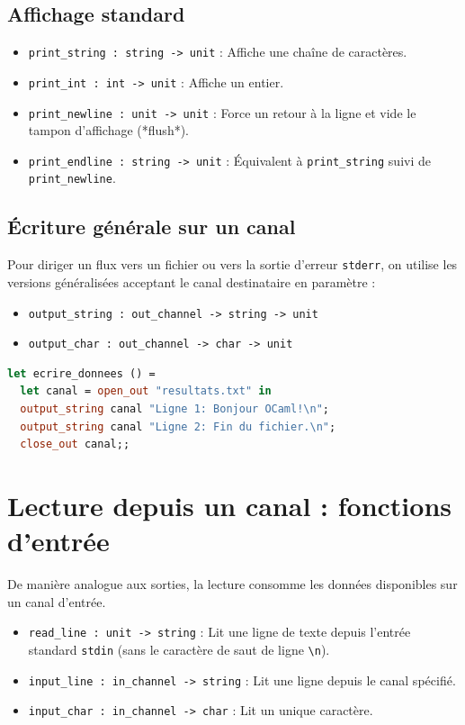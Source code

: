 \documentclass{article}
\begin{document}
\subsection{Affichage standard}
\begin{itemize}
    \item \texttt{print\_string : string -> unit} : Affiche une chaîne de caractères.
    \item \texttt{print\_int : int -> unit} : Affiche un entier.
    \item \texttt{print\_newline : unit -> unit} : Force un retour à la ligne et vide le tampon d'affichage (*flush*).
    \item \texttt{print\_endline : string -> unit} : Équivalent à \texttt{print\_string} suivi de \texttt{print\_newline}.
\end{itemize}

\subsection{Écriture générale sur un canal}
Pour diriger un flux vers un fichier ou vers la sortie d'erreur \texttt{stderr}, on utilise les versions généralisées acceptant le canal destinataire en paramètre :
\begin{itemize}
    \item \texttt{output\_string : out\_channel -> string -> unit}
    \item \texttt{output\_char : out\_channel -> char -> unit}
\end{itemize}

\begin{lstlisting}[language=Caml]
let ecrire_donnees () =
  let canal = open_out "resultats.txt" in
  output_string canal "Ligne 1: Bonjour OCaml!\n";
  output_string canal "Ligne 2: Fin du fichier.\n";
  close_out canal;;
\end{lstlisting}

\section{Lecture depuis un canal : fonctions d'entrée}

De manière analogue aux sorties, la lecture consomme les données disponibles sur un canal d'entrée.

\begin{itemize}
    \item \texttt{read\_line : unit -> string} : Lit une ligne de texte depuis l'entrée standard \texttt{stdin} (sans le caractère de saut de ligne \texttt{\textbackslash n}).
    \item \texttt{input\_line : in\_channel -> string} : Lit une ligne depuis le canal spécifié.
    \item \texttt{input\_char : in\_channel -> char} : Lit un unique caractère.
\end{itemize}
\end{document}
